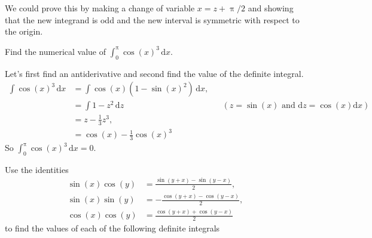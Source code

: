 \documentclass[12pt,fleqn,answers]{exam}
\begin{document}
\begin{questions}
\begin{solution}
\quad We could prove this by making a change of variable $x = z + \uppi/2$
and showing that the new integrand is odd and the new interval is
symmetric with respect to the origin.
\end{solution}
\newpage
\question [2] Find the numerical value of $\int_0^\uppi \cos(x)^3 \, \mathrm{d} x$.
\begin{solution}[2.5in] Let's first find an antiderivative 
    and second find the value of the definite integral.
\begin{align*}
  \int \cos(x)^3 \, \mathrm{d} x &= \int \cos(x) (1-\sin(x)^2) \, \mathrm{d} x, \\
                                 &= \int 1 - z^2 \, \mathrm{d}z &&(z = \sin(x) \text{ and } \mathrm{d}z = \cos(x) \mathrm{d} x)\\
                                 &= z - \frac{1}{3} z^3,\\
                                 &= \cos(x ) - \frac{1}{3} \cos(x)^3
  \end{align*}                    
So $\int_0^\uppi \cos(x)^3 \, \mathrm{d} x  = 0$.
\end{solution}

\newpage 
\question [3] Use the identities
\begin{align*}
    \sin{(x)} \cos{(y)} &= \frac{\sin{\left( y+x\right) }-\sin{\left( y-x\right) }}{2}, \\
    \sin{(x)} \sin{(y)} &=  -\frac{\cos{\left( y+x\right) }-\cos{\left( y-x\right) }}{2}, \\
    \cos{(x)} \cos{(y)} &= \frac{\cos{\left( y+x\right) }+\cos{\left( y-x\right) }}{2}  
\end{align*}
to find the values of each of the following definite integrals

\end{questions}
\end{document}
